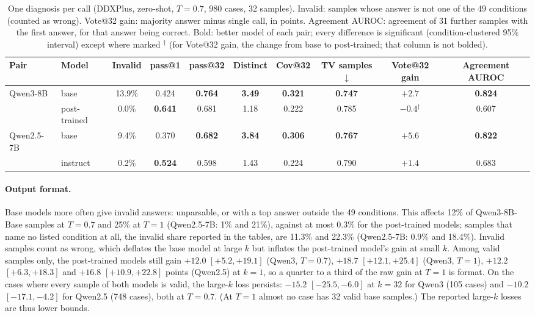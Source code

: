 \documentclass[wcp]{jmlr}
\begin{document}
\begin{table}[t]
\centering\small
\setlength{\tabcolsep}{3.5pt}
\begin{adjustbox}{max width=\linewidth}
\begin{tabular}{llcccccccc}
\toprule
Pair & Model & Invalid & pass@1 & pass@32 & Distinct & Cov@32 & TV samples$\downarrow$ & Vote@32 gain & Agreement AUROC \\
\midrule
Qwen3-8B & base & 13.9\% & 0.424 & \textbf{0.764} & \textbf{3.49} & \textbf{0.321} & \textbf{0.747} & $+2.7$ & \textbf{0.824} \\
 & post-trained & 0.0\% & \textbf{0.641} & 0.681 & 1.18 & 0.222 & 0.785 & $-0.4$$^{\dagger}$ & 0.607 \\
Qwen2.5-7B & base & 9.4\% & 0.370 & \textbf{0.682} & \textbf{3.84} & \textbf{0.306} & \textbf{0.767} & $+5.6$ & \textbf{0.822} \\
 & instruct & 0.2\% & \textbf{0.524} & 0.598 & 1.43 & 0.224 & 0.790 & $+1.4$ & 0.683 \\
\bottomrule
\end{tabular}
\end{adjustbox}
\caption{One diagnosis per call (DDXPlus, zero-shot, $T{=}0.7$, 980 cases, 32 samples). Invalid: samples whose answer is not one of the 49 conditions (counted as wrong). Vote@32 gain: majority answer minus single call, in points. Agreement AUROC: agreement of 31 further samples with the first answer, for that answer being correct. Bold: better model of each pair; every difference is significant (condition-clustered 95\% interval) except where marked $^{\dagger}$ (for Vote@32 gain, the change from base to post-trained; that column is not bolded).}
\label{tab:single}
\end{table}

\paragraph{Output format.} Base models more often give invalid answers: unparsable, or with a top answer outside the 49 conditions. This affects 12\% of Qwen3-8B-Base samples at $T{=}0.7$ and 25\% at $T{=}1$ (Qwen2.5-7B: 1\% and 21\%), against at most 0.3\% for the post-trained models; samples that name no listed condition at all, the invalid share reported in the tables, are 11.3\% and 22.3\% (Qwen2.5-7B: 0.9\% and 18.4\%).
Invalid samples count as wrong, which deflates the base model at large $k$ but inflates the post-trained model's gain at small $k$.
Among valid samples only, the post-trained models still gain $+12.0$ $[+5.2,+19.1]$ (Qwen3, $T{=}0.7$), $+18.7$ $[+12.1,+25.4]$ (Qwen3, $T{=}1$), $+12.2$ $[+6.3,+18.3]$ and $+16.8$ $[+10.9,+22.8]$ points (Qwen2.5) at $k{=}1$, so a quarter to a third of the raw gain at $T{=}1$ is format.
On the cases where every sample of both models is valid, the large-$k$ loss persists: $-15.2$ $[-25.5,-6.0]$ at $k{=}32$ for Qwen3 (105 cases) and $-10.2$ $[-17.1,-4.2]$ for Qwen2.5 (748 cases), both at $T{=}0.7$. (At $T{=}1$ almost no case has 32 valid base samples.) The reported large-$k$ losses are thus lower bounds.
\end{document}
